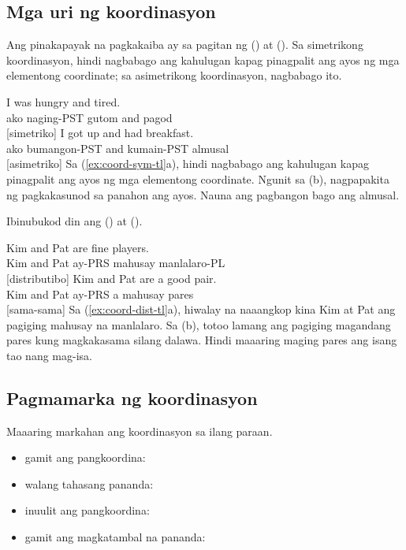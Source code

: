 \subsection{Mga uri ng koordinasyon}

Ang pinakapayak na pagkakaiba ay sa pagitan ng  () at  (). Sa simetrikong koordinasyon, hindi nagbabago ang kahulugan kapag pinagpalit ang ayos ng mga elementong coordinate; sa asimetrikong koordinasyon, nagbabago ito.

\ea \label{ex:coord-sym-tl}
    \ea \gll I was hungry and tired.\\
        ako naging-PST gutom and pagod\\
    \glt {} [simetriko]
    \ex \gll I got up and had breakfast.\\
        ako bumangon-PST and kumain-PST almusal\\
    \glt {} [asimetriko]
    \z
\z
Sa (\ref{ex:coord-sym-tl}a), hindi nagbabago ang kahulugan kapag pinagpalit ang ayos ng mga elementong coordinate. Ngunit sa (b), nagpapakita ng pagkakasunod sa panahon ang ayos. Nauna ang pagbangon bago ang almusal.

Ibinubukod din ang  () at  ().

\ea \label{ex:coord-dist-tl}
    \ea \gll Kim and Pat are fine players.\\
        Kim and Pat ay-PRS mahusay manlalaro-PL\\
    \glt {} [distributibo]
    \ex \gll Kim and Pat are a good pair.\\
        Kim and Pat ay-PRS a mahusay pares\\
    \glt {} [sama-sama]
    \z
\z
Sa (\ref{ex:coord-dist-tl}a), hiwalay na naaangkop kina Kim at Pat ang pagiging mahusay na manlalaro. Sa (b), totoo lamang ang pagiging magandang pares kung magkakasama silang dalawa. Hindi maaaring maging pares ang isang tao nang mag-isa.

\subsection{Pagmamarka ng koordinasyon}

Maaaring markahan ang koordinasyon sa ilang paraan.
\begin{itemize}[noitemsep]
    \item gamit ang pangkoordina: 
    \item walang tahasang pananda: 
    \item inuulit ang pangkoordina: 
    \item gamit ang magkatambal na pananda: 
\end{itemize}

